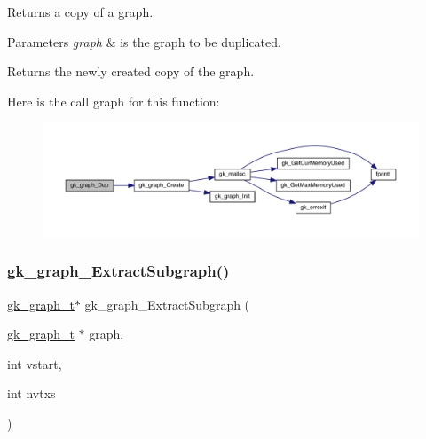 Returns a copy of a graph. 
\begin{DoxyParams}{Parameters}
{\em graph} & is the graph to be duplicated. \\
\hline
\end{DoxyParams}
\begin{DoxyReturn}{Returns}
the newly created copy of the graph. 
\end{DoxyReturn}
Here is the call graph for this function\+:\nopagebreak
\begin{figure}[H]
\begin{center}
\leavevmode
\includegraphics[width=350pt]{a00077_a24db906b45a9848fc26c49cb967d68c8_cgraph}
\end{center}
\end{figure}
\mbox{\label{a00077_a1d2e1fe0550575de31f32a8c146f6643}} 
\subsubsection{\texorpdfstring{gk\+\_\+graph\+\_\+\+Extract\+Subgraph()}{gk\_graph\_ExtractSubgraph()}}
{\footnotesize\ttfamily \hyperlink{a00638}{gk\+\_\+graph\+\_\+t}$\ast$ gk\+\_\+graph\+\_\+\+Extract\+Subgraph (\begin{DoxyParamCaption}\item[{\hyperlink{a00638}{gk\+\_\+graph\+\_\+t} $\ast$}]{graph,  }\item[{int}]{vstart,  }\item[{int}]{nvtxs }\end{DoxyParamCaption})}

